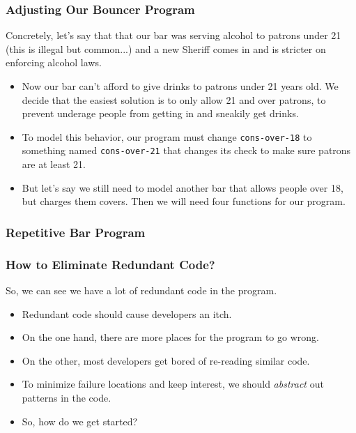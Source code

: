 \documentclass{beamer}
\begin{document}
\begin{frame}
  \frametitle{Adjusting Our Bouncer Program}
  Concretely, let's say that that our bar was serving alcohol to
    patrons under 21 (this is illegal but common...) and a new Sheriff comes in
    and is stricter on enforcing alcohol laws.
    \begin{itemize}
  \item<2-> Now our bar can't afford to give drinks to patrons under 21 years old.
    We decide that the easiest solution is to only allow 21 and over patrons,
    to prevent underage people from getting in and sneakily get drinks.
  \item<3-> To model this behavior, our program must change
    \texttt{cons-over-18} to something named \texttt{cons-over-21} that changes its check to make sure patrons are at least 21.
  \item<4-> But let's say we still need to model another bar that allows people over 18, but charges them covers. Then we will need four functions for our program.  
  \end{itemize}
\end{frame}

\begin{frame}
  \frametitle{Repetitive Bar Program}
  \BarComplex
\end{frame}

\begin{frame}
  \frametitle{How to Eliminate Redundant Code?}
  So, we can see we have a lot of redundant code in the program.
  \begin{itemize}
  \item<2-> Redundant code should cause developers an itch.
  \item<3-> On the one hand, there are more places for the program
    to go wrong.
  \item<4-> On the other, most developers get bored of re-reading similar code.
  \item<5-> To minimize failure locations and keep interest, we should
    \emph{abstract} out patterns in the code.
  \item<6-> So, how do we get started?
  \end{itemize}
\end{frame}

\end{document}
